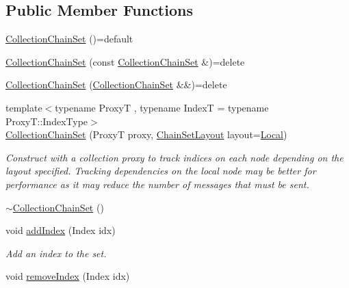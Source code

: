 \subsection*{Public Member Functions}
\begin{DoxyCompactItemize}
\item 
\hyperlink{classvt_1_1messaging_1_1_collection_chain_set_aeb43ad4a2e46ea059817b639b72ddb3b}{Collection\+Chain\+Set} ()=default
\item 
\hyperlink{classvt_1_1messaging_1_1_collection_chain_set_a71328cb5c03210ffdb0bd5dd5f3b6797}{Collection\+Chain\+Set} (const \hyperlink{classvt_1_1messaging_1_1_collection_chain_set}{Collection\+Chain\+Set} \&)=delete
\item 
\hyperlink{classvt_1_1messaging_1_1_collection_chain_set_a21be566436c86fa59a02a1bd073a9e48}{Collection\+Chain\+Set} (\hyperlink{classvt_1_1messaging_1_1_collection_chain_set}{Collection\+Chain\+Set} \&\&)=delete
\item 
{\footnotesize template$<$typename ProxyT , typename IndexT  = typename Proxy\+T\+::\+Index\+Type$>$ }\\\hyperlink{classvt_1_1messaging_1_1_collection_chain_set_a307795a4cfc6c794ea3979655a97be91}{Collection\+Chain\+Set} (ProxyT proxy, \hyperlink{namespacevt_1_1messaging_af09e66b5a14598baf7e4b56ad6080ec2}{Chain\+Set\+Layout} layout=\hyperlink{namespacevt_1_1messaging_af09e66b5a14598baf7e4b56ad6080ec2a010b35e408e991d56531802665998408}{Local})
\begin{DoxyCompactList}\small\item\em Construct with a collection proxy to track indices on each node depending on the layout specified. Tracking dependencies on the local node may be better for performance as it may reduce the number of messages that must be sent. \end{DoxyCompactList}\item 
\hyperlink{classvt_1_1messaging_1_1_collection_chain_set_a8ee6333242f51748e17328f185b3b999}{$\sim$\+Collection\+Chain\+Set} ()
\item 
void \hyperlink{classvt_1_1messaging_1_1_collection_chain_set_aefc11c9b011b4916c3b80dfc8f776239}{add\+Index} (Index idx)
\begin{DoxyCompactList}\small\item\em Add an index to the set. \end{DoxyCompactList}\item 
void \hyperlink{classvt_1_1messaging_1_1_collection_chain_set_a299e52c482aba47bcdabe796d236c043}{remove\+Index} (Index idx)

\end{DoxyCompactItemize}
